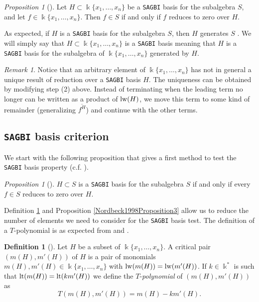 \documentclass{amsart}
\theoremstyle{definition}
\newtheorem{definition}[theorem]{Definition}
\theoremstyle{remark}
\newtheorem{remark}[theorem]{Remark}
\newtheorem{proposition}[theorem]{Proposition}
\numberwithin{equation}{section}
\begin{document}
\begin{proposition}[{\cite[Proposition 1]{Nordbeck1998}}]\label{Nordbeck1998Proposition1}
    Let $H \subset \Bbbk \{x_1, \dotsc, x_n\}$ be a {\rm \texttt{SAGBI}} basis for the subalgebra $S$, and let $f \in \Bbbk \{x_1, \dotsc, x_n\}$. Then $f\in S$ if and only if $f$ reduces to zero over $H$.
\end{proposition}

As expected, if $H$ is a \texttt{SAGBI} basis for the subalgebra $S$, then $H$ generates $S$ \cite[Corollary 1]{Nordbeck1998}. We will simply say that $H\subset \Bbbk \{x_1, \dotsc, x_n\}$ is a \texttt{SAGBI} basis meaning that $H$ is a \texttt{SAGBI} basis for the subalgebra of $\Bbbk \{x_1, \dotsc, x_n\}$ generated by $H$.

\begin{remark}
    Notice that an arbitrary element of $\Bbbk \{x_1, \dotsc, x_n\}$ has not in general a unique result of reduction over a \texttt{SAGBI} basis $H$. The uniqueness can be obtained by modifying step (2) above. Instead of terminating when the leading term no longer can be written as a product of ${\rm lw}(H)$, we move this term to some kind of remainder (generalizing $\overline{f^H}$) and continue with the other terms.
\end{remark}


\subsection{\texttt{SAGBI} basis criterion}\label{Nordbeck1998Section3}

We start with the following proposition that gives a first method to test the \texttt{SAGBI} basis property (c.f.  \cite[Proposition 6.6.28]{KreuzerRobbiano2005}).

\begin{proposition}[{\cite[Proposition 2]{Nordbeck1998}}]\label{Nordbeck1998Proposition2}
    $H \subset S$ is a {\rm \texttt{SAGBI}} basis for the subalgebra $S$ if and only if every $f\in S$ reduces to zero over $H$.
\end{proposition}

Definition \ref{Nordbeck1998Definition3} and Proposition \ref{Nordbeck1998Proposition3} allow us to reduce the number of elements we need to consider for the \texttt{SAGBI} basis test. The definition of a $T$-polynomial is as expected from \cite[Definition 6.6.26]{KreuzerRobbiano2005} and \cite[Definition 2]{Nordbeck2002}.

\begin{definition}[{\cite[Definition 3]{Nordbeck1998}}]\label{Nordbeck1998Definition3}
Let $H$ be a subset of $\Bbbk \{x_1, \dotsc, x_n\}$. A critical pair $(m(H), m'(H))$ of $H$ is a pair of monomials $m(H), m'(H)\in \Bbbk \{x_1, \dotsc, x_n\}$ with ${\rm lw}(m(H)) = {\rm lw}(m'(H))$. If $k \in \Bbbk^{*}$ is such that ${\rm lt}(m(H)) = {\rm lt}(k m'(H))$ we define the $T$-{\em polynomial} of $(m(H), m'(H))$ as $$
T(m(H), m'(H)) = m(H) - km'(H). 
$$
\end{definition}
\end{document}
